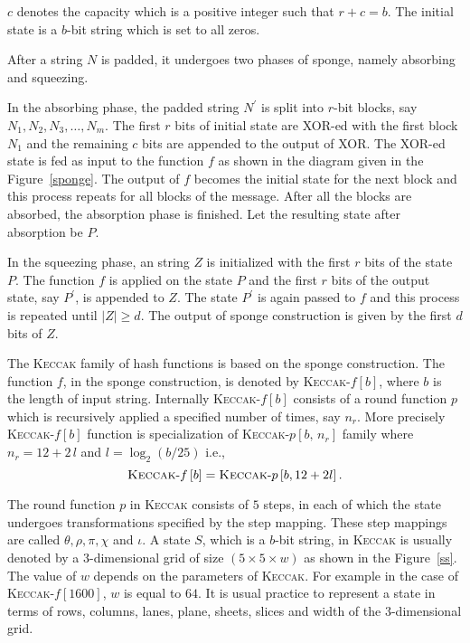 \documentclass[runningheads]{llncs}
\newcommand{\Keccak}{\mbox{\textsc{Keccak}}}
\begin{document}
$c$ denotes the capacity which is a positive integer such that $r + c = b$. The initial state is a $b$-bit string which is set to all zeros. 

After a string $N$ is padded, it undergoes two phases of sponge, namely absorbing and squeezing. 

In the absorbing phase, the padded string $N^\prime$ is split into $r$-bit blocks, say $N_1, N_2, N_3,\ldots,N_m$. The first $r$ bits of initial state are XOR-ed with the first block $N_1$ and the remaining $c$ bits are appended to the output of XOR. The XOR-ed state is fed as input to the function $f$ as shown in the diagram given in the Figure~\ref{sponge}. The output of $f$ becomes the initial state for the next block and this process repeats for all blocks of the message. After all the blocks are absorbed, the absorption phase is finished. Let the resulting state after absorption be $P$. 

In the squeezing phase, an string $Z$ is initialized with the first $r$ bits of the state $P$. The function $f$ is applied on the state $P$ and the first $r$ bits of the output state, say $P^\prime$, is appended to $Z$. The state $P^\prime$ is again passed to $f$ and this process is repeated until $|Z| \geq d$. The output of sponge construction is given by the first $d$ bits of $Z$.
% 

The \Keccak{} family of hash functions is based on the sponge construction. The function $f$, in the sponge construction, is denoted by \Keccak-$f\left[b\right]$, where $b$ is the length of input string. Internally \Keccak-$f\left[b\right]$ consists of a round function $p$ which is recursively applied a specified number of times, say $n_r$. More precisely \Keccak-$f\left[b\right]$ function is specialization of \Keccak-$p\left[b,\,n_r\right]$ family where $n_r = 12 + 2\,l$ and $l = \log_2 (b/25)$ i.e.,
\[
	\Keccak\text{-}f\left[b\right] = \Keccak\text{-}p\left[b,  12 + 2l\right].
\]

The round function $p$ in \Keccak{} consists of $5$ steps, in each of which the state undergoes transformations specified by the step mapping. These step mappings are called $\theta, \rho, \pi, \chi$ and  $\iota$. A state $S$, which is a $b$-bit string, in \Keccak{} is usually denoted by a $3$-dimensional grid of size $(5 \times 5 \times w)$ as shown in the Figure~\ref{ss}. The value of $w$ depends on the parameters of \Keccak{}. For example in the case of \Keccak-$f\left[1600\right]$, $w$ is equal to $64$. It is usual practice to represent a state in terms of rows, columns, lanes, plane, sheets, slices and width of the $3$-dimensional grid.
\end{document}
